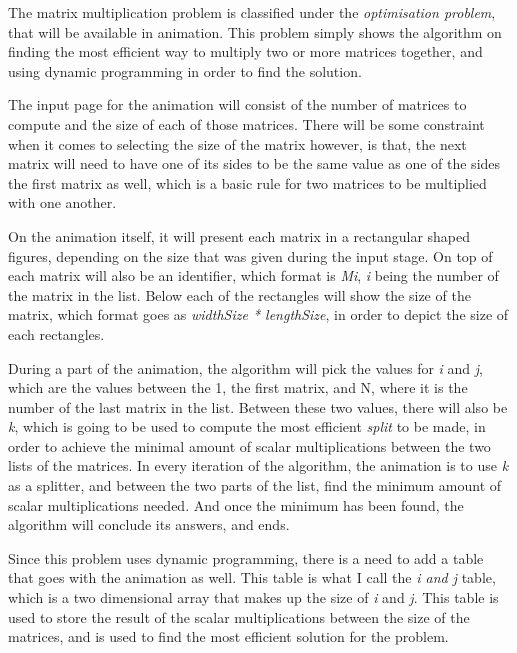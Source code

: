 The matrix multiplication problem is classified under the \textit{optimisation problem}, that will be available in animation. This problem simply shows the algorithm on finding the most efficient way to multiply two or more matrices together, and using dynamic programming in order to find the solution. 

The input page for the animation will consist of the number of matrices to compute and the size of each of those matrices. There will be some constraint when it comes to selecting the size of the matrix however, is that, the next matrix will need to have one of its sides to be the same value as one of the sides the first matrix as well, which is a basic rule for two matrices to be multiplied with one another.

On the animation itself, it will present each matrix in a rectangular shaped figures, depending on the size that was given during the input stage. On top of each matrix will also be an identifier, which format is \textit{Mi}, \textit{i} being the number of the matrix in the list. Below each of the rectangles will show the size of the matrix, which format goes as \textit{widthSize * lengthSize}, in order to depict the size of each rectangles.

During a part of the animation, the algorithm will pick the values for \textit{i} and \textit{j}, which are the values between the 1, the first matrix, and N, where it is the number of the last matrix in the list. Between these two values, there will also be \textit{k}, which is going to be used to compute the most efficient \textit{split} to be made, in order to achieve the minimal amount of scalar multiplications between the two lists of the matrices. In every iteration of the algorithm, the animation is to use \textit{k} as a splitter, and between the two parts of the list, find the minimum amount of scalar multiplications needed. And once the minimum has been found, the algorithm will conclude its answers, and ends.

Since this problem uses dynamic programming, there is a need to add a table that goes with the animation as well. This table is what I call the \textit{i and j} table, which is a two dimensional array that makes up the size of \textit{i} and \textit{j}. This table is used to store the result of the scalar multiplications between the size of the matrices, and is used to find the most efficient solution for the problem. 

\newpage



